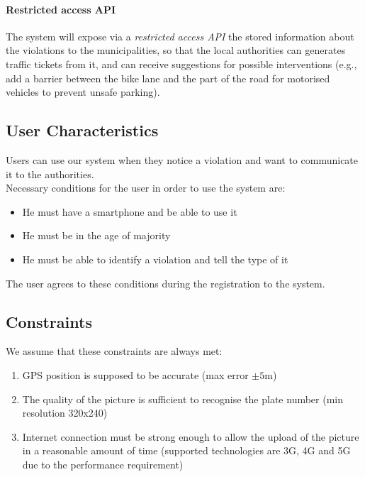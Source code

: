 \paragraph{Restricted access API}
The system will expose via a \emph{restricted access API} the stored information about the violations to the municipalities, so that the local authorities can generates traffic tickets from it, and can receive suggestions for possible interventions (e.g., add a barrier between the bike lane and the part of the road for motorised vehicles to prevent unsafe parking). 



\subsection{User Characteristics}
	Users can use our system when they notice a violation and want to communicate it to the authorities.\\
 	Necessary conditions for the user in order to use the system are:
 	\begin{itemize}
 		\item He must have a smartphone and be able to use it
 		\item He must be in the age of majority
 		\item He must be able to identify a violation and tell the type of it
 	\end{itemize}
 	The user agrees to these conditions during the registration to the system.
 	
\subsection{Constraints}
	We assume that these constraints are always met:
	\begin{enumerate}[label=\textbf{C\arabic*}]
		\item GPS position is supposed to be accurate (max error $\pm5$m)
		\item The quality of the picture is sufficient to recognise the plate number (min resolution 320x240)
		\item Internet connection must be strong enough to allow the upload of the picture in a reasonable amount of time (supported technologies are 3G, 4G and 5G due to the performance requirement)
	\end{enumerate}
	
